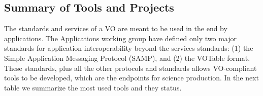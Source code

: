 \subsection{Summary of Tools and Projects}

The standards and services of a VO are meant to be used in the end 
by applications. The Applications working group have defined only two major
standards for application interoperability beyond the services standards: 
(1) the Simple Application Messaging Protocol (SAMP), and (2) the VOTable
format. These standards, plus all the other protocols and standards 
allows VO-compliant tools to be developed, which are the endpoints for
science production. In the next table we summarize the most used tools
and they status.

